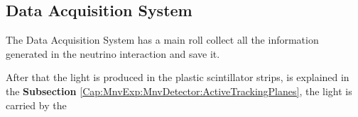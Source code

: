 \subsection{Data Acquisition System }
\label{Cap:MnvExp:MnvDetector:DAQ}

The Data Acquisition System has a main roll collect all the information generated in the neutrino interaction and save it. 

After that the light is produced in the plastic scintillator strips, is explained in the \textbf{Subsection} \ref{Cap:MnvExp:MnvDetector:ActiveTrackingPlanes}, the light is carried by the 







